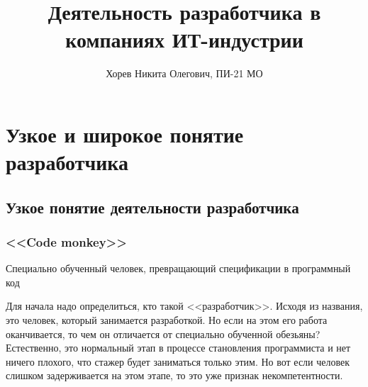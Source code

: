 \documentclass{../industrial-development}
\title{Деятельность разработчика в компаниях ИТ-индустрии}
\author{Хорев Никита Олегович, ПИ-21 МО}
\date{}
\begin{document}
\begin{frame}
  \titlepage
\end{frame}


\section{Узкое и широкое понятие разработчика}
\subsection{Узкое понятие деятельности разработчика}
\begin{frame} \frametitle{<<Code monkey>>}
Специально обученный человек, превращающий спецификации в программный код
\end{frame}
\lecturenotes
Для начала надо определиться, кто такой <<разработчик>>. Исходя из названия, это человек, который занимается разработкой. Но если на этом его работа оканчивается, то чем он отличается от специально обученной обезьяны?\\
Естественно, это нормальный этап в процессе становления программиста и нет ничего плохого, что стажер будет заниматься только этим. Но вот если человек слишком задерживается на этом этапе, то это уже признак некомпетентности.
\end{document}
